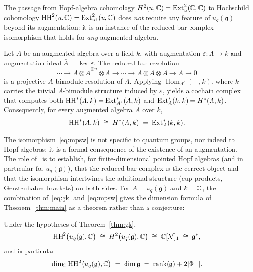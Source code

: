 \medskip
The passage from Hopf-algebra cohomology $H^2(u, \mathbb{C}) = \operatorname{Ext}^2_u(\mathbb{C}, \mathbb{C})$ to Hochschild cohomology $\operatorname{HH}^2(u, \mathbb{C}) = \operatorname{Ext}^2_{u^e}(u, \mathbb{C})$ does \emph{not} require any feature of $u_q(\mathfrak{g})$ beyond its augmentation: it is an instance of the reduced bar complex isomorphism that holds for \emph{any} augmented algebra.

\begin{theorem}
\label{thm:mpsw}
Let $A$ be an augmented algebra over a field $k$, with augmentation $\varepsilon \colon A \to k$ and augmentation ideal $\bar{A} = \ker \varepsilon$. The reduced bar resolution
\[
\cdots \longrightarrow A \otimes \bar{A}^{\otimes n} \otimes A \longrightarrow \cdots \longrightarrow A \otimes \bar{A} \otimes A \longrightarrow A \longrightarrow 0
\]
is a projective $A$-bimodule resolution of $A$. Applying $\operatorname{Hom}_{A^e}(-, k)$, where $k$ carries the trivial $A$-bimodule structure induced by $\varepsilon$, yields a cochain complex that computes both $\operatorname{HH}^*(A, k) = \operatorname{Ext}^*_{A^e}(A, k)$ and $\operatorname{Ext}^*_A(k, k) = H^*(A, k)$. Consequently, for every augmented algebra $A$ over $k$,
\begin{equation}
\label{eq:mpsw}
\operatorname{HH}^*(A, k) \;\cong\; H^*(A, k) \;=\; \operatorname{Ext}^*_A(k, k).
\end{equation}
\end{theorem}

The isomorphism~\eqref{eq:mpsw} is not specific to quantum groups, nor indeed to Hopf algebras: it is a formal consequence of the existence of an augmentation. The role of~\cite{MPSW} is to establish, for finite-dimensional pointed Hopf algebras (and in particular for $u_q(\mathfrak{g})$), that the reduced bar complex is the correct object and that the isomorphism intertwines the additional structure (cup products, Gerstenhaber brackets) on both sides. For $A = u_q(\mathfrak{g})$ and $k = \mathbb{C}$, the combination of~\eqref{eq:gk} and~\eqref{eq:mpsw} gives the dimension formula of Theorem~\ref{thm:main} as a theorem rather than a conjecture:

\begin{corollary}
\label{cor:hh2gk}
Under the hypotheses of Theorem~\ref{thm:gk},
\begin{equation}
\label{eq:hh2gk}
\operatorname{HH}^2\bigl(u_q(\mathfrak{g}), \mathbb{C}\bigr) \;\cong\; H^2\bigl(u_q(\mathfrak{g}), \mathbb{C}\bigr) \;\cong\; \mathbb{C}[\mathcal{N}]_1 \;\cong\; \mathfrak{g}^*,
\end{equation}
and in particular
\[
\dim_{\mathbb{C}} \operatorname{HH}^2\bigl(u_q(\mathfrak{g}), \mathbb{C}\bigr) \;=\; \dim \mathfrak{g} \;=\; \operatorname{rank}(\mathfrak{g}) + 2|\Phi^+|.
\]
\end{corollary}

